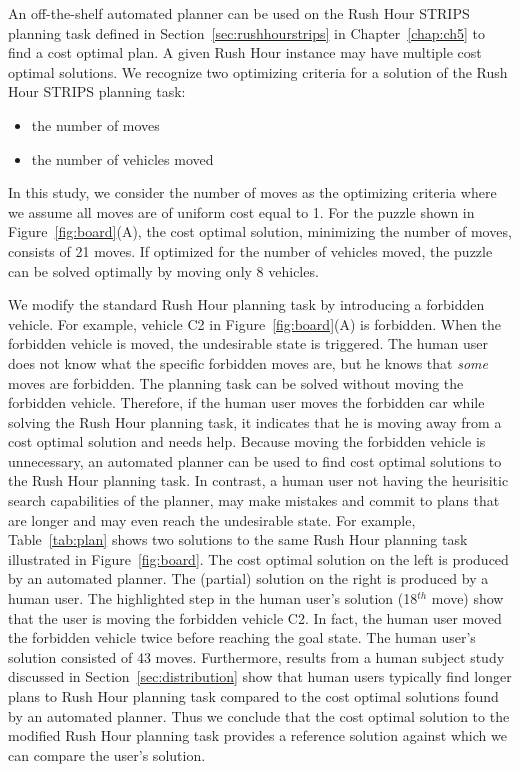 An off-the-shelf automated planner can be used on the Rush Hour STRIPS planning task defined in Section~\ref{sec:rushhourstrips} in
Chapter~\ref{chap:ch5} to find a cost optimal plan.
A given Rush Hour instance may have multiple cost optimal solutions.
We recognize two optimizing criteria for a solution of the Rush Hour STRIPS planning task:
\begin{itemize}
\item the number of moves
\item the number of vehicles moved
\end{itemize}
In this study, we consider the number of moves as the optimizing criteria where we assume all moves are of uniform cost equal to 1.
For the puzzle shown in Figure~\ref{fig:board}(A), the cost optimal solution, minimizing the number of moves, consists of 21 moves. 
If optimized for the number of vehicles moved,
the puzzle can be solved optimally by moving only 8 vehicles.

We modify the standard Rush Hour planning task by introducing a forbidden vehicle. 
For example, vehicle C2 in Figure~\ref{fig:board}(A) is forbidden. 
When the forbidden vehicle is moved, the undesirable state is triggered.
The human user does not know what the specific forbidden moves are, but he knows that \textit{some} moves are forbidden.
The planning task can be solved without moving the forbidden vehicle.
Therefore, if the human user moves the forbidden car while solving the Rush Hour planning task, it indicates that he is moving away from a cost optimal solution and needs help.
Because moving the forbidden vehicle is unnecessary, an automated planner can be used to find cost optimal solutions to the Rush Hour planning task.
In contrast, a human user not having the heurisitic search capabilities of the planner, may make mistakes and commit to plans that are longer and may even reach the undesirable state.
For example, Table~\ref{tab:plan} shows two solutions to the same Rush Hour planning task illustrated in Figure~\ref{fig:board}.
The cost optimal solution on the left is produced by an automated planner. 
The (partial) solution on the right is produced by a human user. 
The highlighted step in the human user's solution (18$^{th}$ move) show that the user is moving the forbidden vehicle C2. 
In fact, the human user moved the forbidden vehicle twice before reaching the goal state.
The human user's solution consisted of 43 moves.
Furthermore, results from a human subject study discussed in Section~\ref{sec:distribution} show that human users typically find longer plans to Rush Hour planning task compared to the cost optimal solutions found by an automated planner.
Thus we conclude that the cost optimal solution to the modified Rush Hour planning task provides a reference solution against which we can compare the user’s solution.

